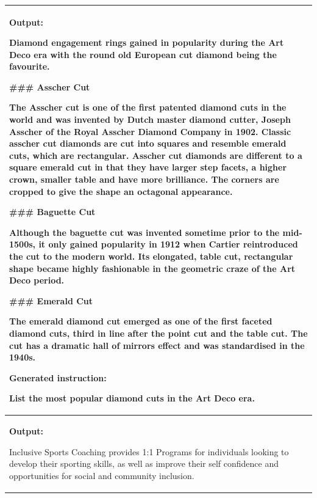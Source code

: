 \begin{table}[t]

  \centering
  \begin{tabular}{l}
    \toprule
\begin{minipage}{40em}

\textbf{Output:}
\newline
\begin{lmttfont}
Diamond engagement rings gained in popularity during the Art Deco era with the round old European cut diamond being the favourite.

\#\#\# Asscher Cut

The Asscher cut is one of the first patented diamond cuts in the world and was invented by Dutch master diamond cutter, Joseph Asscher of the Royal Asscher Diamond Company in 1902.  Classic asscher cut diamonds are cut into squares and resemble emerald cuts, which are rectangular. Asscher cut diamonds are different to a square emerald cut in that they have larger step facets, a higher crown, smaller table and have more brilliance. The corners are cropped to give the shape an octagonal appearance.

\#\#\# Baguette Cut

Although the baguette cut was invented sometime prior to the mid-1500s, it only gained popularity in 1912 when Cartier reintroduced the cut to the modern world. Its elongated, table cut, rectangular shape became highly fashionable in the geometric craze of the Art Deco period.

\#\#\# Emerald Cut

The emerald diamond cut emerged as one of the first faceted diamond cuts, third in line after the point cut and the table cut. The cut has a dramatic hall of mirrors effect and was standardised in the 1940s.  
\end{lmttfont}

\textbf{Generated instruction:}
\begin{lmttfont}
List the most popular diamond cuts in the Art Deco era.
\end{lmttfont}
    

\end{minipage}\\
    \midrule
\begin{minipage}{40em}


\textbf{Output:}
\newline
\begin{lmttfont}
Inclusive Sports Coaching provides 1:1 Programs for individuals looking to develop their sporting skills, as well as improve their self confidence and opportunities for social and community inclusion.


\end{lmttfont}
\end{minipage}
\end{tabular}
\end{table}
